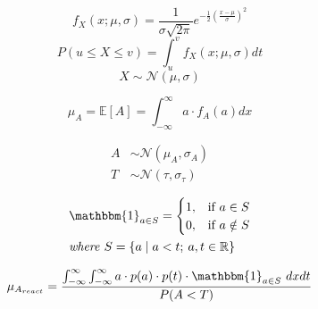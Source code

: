 \documentclass[12pt,letterpaper]{article}
\begin{document}
\begin{equation}
    f_{X}(x; \mu, \sigma) = \frac{1}{\sigma\sqrt{2\pi}}e^{-\frac{1}{2}(\frac{x-\mu}{\sigma})^2}
\end{equation}
\begin{equation}
    P(u\leq X\leq v) = \int_{u}^{v} f_{X}(x; \mu, \sigma)dt
\end{equation}
\begin{equation}
    X\sim\mathcal{N}(\mu,\sigma)
\end{equation}


\begin{equation}
    \mu_{A} = \mathbb{E}[A] = \int_{-\infty}^{\infty}a \cdot f_{A}(a)dx
\end{equation}

\begin{align}
    A & \sim\mathcal{N}(\mu_{A},\sigma_{A}) \\
    T & \sim\mathcal{N}(\tau,\sigma_{\tau})
\end{align}



\begin{align}
     & \mathbbm{1}_{a \in S} =
    \begin{cases}
        1, & \text{if } a \in S     \\
        0, & \text{if }  a \notin S
    \end{cases}                                                             \\
     & \text{\emph{where} } S = \{a \mid a < t; \hspace{2pt} a,t \in \mathbb{R}\} \nonumber
\end{align}

\begin{equation}
    \mu_{A_{react}} = \dfrac{\int_{-\infty}^{\infty}  \int_{-\infty}^{\infty} a \cdot p(a) \cdot p(t) \cdot \mathbbm{1}_{a \in S} \ dxdt} {P(A<T) }
\end{equation}
\end{document}
